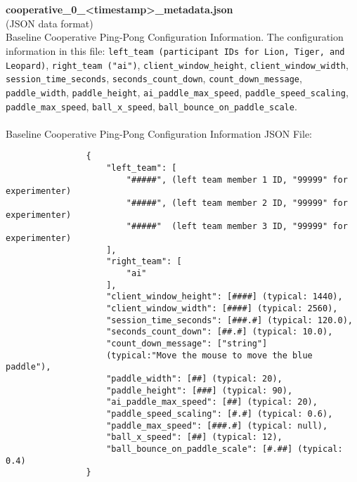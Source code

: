 \begin{description}
\begin{addmargin}[0em]{0em}
        \textbf{\\\\}
        \begin{addmargin}[1em]{0em} %
            \label{cooperative_0_<timestamp>_metadata.json}
            \textbf{cooperative\_0\_<timestamp>\_metadata.json}\\(JSON data format)\\
            Baseline Cooperative Ping-Pong Configuration Information. The configuration
            information in this file: \verb|left_team (participant IDs for Lion, Tiger, and Leopard)|, \verb|right_team ("ai")|,
            \verb|client_window_height|, \verb|client_window_width|, \verb|session_time_seconds|,
            \verb|seconds_count_down|, \verb|count_down_message|, \verb|paddle_width|, \verb|paddle_height|,
            \verb|ai_paddle_max_speed|, \verb|paddle_speed_scaling|, \verb|paddle_max_speed|, \verb|ball_x_speed|,
            \verb|ball_bounce_on_paddle_scale|.\\\\
            Baseline Cooperative Ping-Pong Configuration Information JSON File:
            \begin{verbatim}
                {
                    "left_team": [
                        "#####", (left team member 1 ID, "99999" for experimenter)
                        "#####", (left team member 2 ID, "99999" for experimenter)
                        "#####"  (left team member 3 ID, "99999" for experimenter)
                    ],
                    "right_team": [
                        "ai"
                    ],
                    "client_window_height": [####] (typical: 1440),
                    "client_window_width": [####] (typical: 2560),
                    "session_time_seconds": [###.#] (typical: 120.0),
                    "seconds_count_down": [##.#] (typical: 10.0),
                    "count_down_message": ["string"]
                    (typical:"Move the mouse to move the blue paddle"),
                    "paddle_width": [##] (typical: 20),
                    "paddle_height": [###] (typical: 90),
                    "ai_paddle_max_speed": [##] (typical: 20),
                    "paddle_speed_scaling": [#.#] (typical: 0.6),
                    "paddle_max_speed": [###.#] (typical: null),
                    "ball_x_speed": [##] (typical: 12),
                    "ball_bounce_on_paddle_scale": [#.##] (typical: 0.4)
                }
            \end{verbatim}
        \end{addmargin} %


\end{addmargin}
\end{description}

